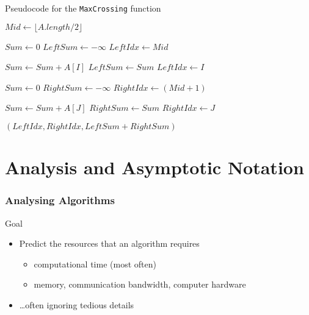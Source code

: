 \documentclass{beamer}
\begin{document}
\begin{frame}
  \begin{block}{Pseudocode for the \texttt{MaxCrossing} function}
  \begin{tiny}
  \begin{algorithmic}
       \State $Mid \gets \lfloor A.length / 2 \rfloor$
       \State

       \State $Sum \gets 0$
       \State $LeftSum \gets -\infty$
       \State $LeftIdx \gets Mid$

       \State
         \State $Sum \gets Sum + A[I]$
           \State $LeftSum \gets Sum$
           \State $LeftIdx \gets I$
         \EndIf
       \EndFor

       \State
       \State $Sum \gets 0$
       \State $RightSum \gets -\infty$
       \State $RightIdx \gets (Mid + 1)$

       \State
       
         \State $Sum \gets Sum + A[J]$
           \State $RightSum \gets Sum$
           \State $RightIdx \gets J$
         \EndIf
       \EndFor

       \State
        $(LeftIdx, RightIdx, LeftSum + RightSum)$
    \EndProcedure
  \end{algorithmic}
  \end{tiny}
  \end{block}
\end{frame}

\section{Analysis and Asymptotic Notation}

\begin{frame}
  \frametitle{Analysing Algorithms}

  \begin{block}{Goal}
    \begin{itemize}
     \item Predict the resources that an algorithm requires
       \begin{itemize}
         \item computational time \pause (most often)
         \item memory, communication bandwidth, computer hardware
       \end{itemize}
     \item \ldots often ignoring tedious details
     \end{itemize}  
  \end{block}
\end{frame}
\end{document}
